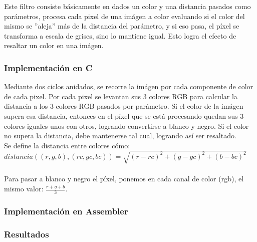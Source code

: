 Este filtro consiste b\'asicamente en dados un color y una distancia pasados como par\'ametros, procesa cada pixel de una im\'agen a color evaluando si el color del mismo se ''aleja'' m\'as de la distancia del par\'ametro, y si eso pasa, el p\'ixel se transforma a escala de grises, sino lo mantiene igual. Esto logra el efecto de resaltar un color en una im\'agen.

\subsubsection{Implementación en C}
Mediante dos ciclos anidados, se recorre la im\'agen por cada componente de color de cada pixel. Por cada pixel se levantan sus 3 colores RGB para calcular la distancia a los 3 colores RGB pasados por par\'ametro. Si el color de la im\'agen supera esa distancia, entonces en el p\'ixel que se est\'a procesando quedan sus 3 colores iguales unos con otros, logrando convertirse a blanco y negro. Si el color no supera la distancia, debe mantenerse tal cual, logrando as\'i ser resaltado.\\
Se define la distancia entre colores c\'omo:\\
$distancia((r, g, b), (rc, gc, bc)) = \sqrt{(r − rc)^2 + (g − gc)^2 + (b − bc)^2}$\\\\
Para pasar a blanco y negro el p\'ixel, ponemos en cada canal de color (rgb), el mismo valor: $\frac{r + g + b}{3}$.


\subsubsection{Implementación en Assembler}


\subsubsection{Resultados}
